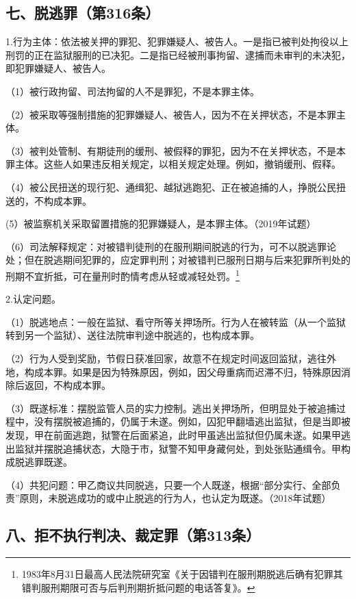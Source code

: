 \subsection*{七、脱逃罪（第316条）}

1.行为主体：依法被关押的罪犯、犯罪嫌疑人、被告人。一是指已被判处拘役以上刑罚的正在监狱服刑的已决犯。二是指已经被刑事拘留、逮捕而未审判的未决犯，即犯罪嫌疑人、被告人。

（1）被行政拘留、司法拘留的人不是罪犯，不是本罪主体。

（2）被采取等强制措施的犯罪嫌疑人、被告人，因为不在关押状态，不是本罪主体。

（3）被判处管制、有期徒刑的缓刑、被假释的罪犯，因为不在关押状态，不是本罪主体。这些人如果违反相关规定，以相关规定处理。例如，撤销缓刑、假释。

（4）被公民扭送的现行犯、通缉犯、越狱逃跑犯、正在被追捕的人，挣脱公民扭送的，不构成本罪。

(5）被监察机关采取留置措施的犯罪嫌疑人，是本罪主体。（2019年试题）

（6）司法解释规定：对被错判徒刑的在服刑期间脱逃的行为，可不以脱逃罪论处；但在脱逃期间犯罪的，应定罪判刑；对被错判已服刑日期与后来犯罪所判处的刑期不宜折抵，可在量刑时酌情考虑从轻或减轻处罚。\footnote{1983年8月31日最高人民法院研究室《关于因错判在服刑期脱逃后确有犯罪其错判服刑期限可否与后判刑期折抵问题的电话答复》。}

2.认定问题。

（1）脱逃地点：一般在监狱、看守所等关押场所。行为人在被转监（从一个监狱转到另一个监狱）、送往法院审判途中脱逃的，也构成本罪。

（2）行为人受到奖励，节假日获准回家，故意不在规定时间返回监狱，逃往外地，构成本罪。如果是因为特殊原因，例如，因父母重病而迟滞不归，特殊原因消除后返回，不构成本罪。

（3）既遂标准：摆脱监管人员的实力控制。逃出关押场所，但明显处于被追捕过程中，没有摆脱被追捕的，仍属于未遂。例如，囚犯甲翻墙逃出监狱，但是当即被发现，甲在前面逃跑，狱警在后面紧追，此时甲虽逃出监狱但仍属未遂。如果甲逃出监狱并摆脱追捕状态，大隐于市，狱警不知甲身藏何处，到处张贴通缉令。甲构成脱逃罪既遂。

（4）共犯问题：甲乙商议共同脱逃，只要一个人既遂，根据“部分实行、全部负责”原则，未脱逃成功的或中止脱逃的行为人，也认定为既遂。（2018年试题）

\subsection*{八、拒不执行判决、裁定罪（第313条）}

